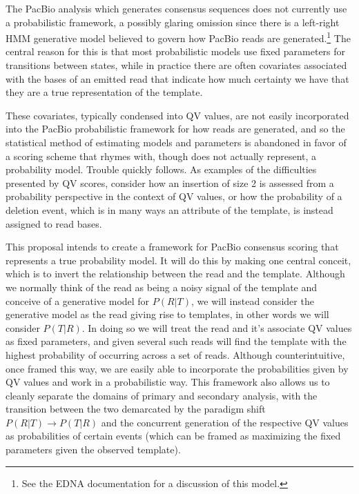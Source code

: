 \documentclass[fleqn,10pt]{SelfArx} %
\begin{document}
The PacBio analysis which generates consensus sequences does not currently use a probabilistic framework, a possibly glaring omission since there is a left-right HMM generative model believed to govern how PacBio reads are generated.\footnote{See the EDNA documentation for a discussion of this model.}  The central reason for this is that most probabilistic models use fixed parameters for transitions between states, while in practice there are often covariates associated with the bases of an emitted read that indicate how much certainty we have that they are a true representation of the template.

These covariates, typically condensed into QV values, are not easily incorporated into the PacBio probabilistic framework for how reads are generated, and so the statistical method of estimating models and parameters is abandoned in favor of a scoring scheme that rhymes with, though does not actually represent, a probability model.  Trouble quickly follows.  As examples of the difficulties presented by QV scores, consider how an insertion of size 2 is assessed from a probability perspective in the context of QV values, or how the probability of a deletion event, which is in many ways an attribute of the template, is instead assigned to read bases.

This proposal intends to create a framework for PacBio consensus scoring that represents a true probability model.  It will do this by making one central conceit, which is to invert the relationship between the read and the template.  Although we normally think of the read as being a noisy signal of the template and conceive of a generative model for $P(R|T)$, we will instead consider the generative model as the read giving rise to templates, in other words we will consider $P(T|R)$.  In doing so we will treat the read and it's associate QV values as fixed parameters, and given several such reads will find the template with the highest probability of occurring across a set of reads.  Although counterintuitive, once framed this way, we are easily able to incorporate the probabilities given by QV values and work in a probabilistic way.  This framework also allows us to cleanly separate the domains of primary and secondary analysis, with the transition between the two demarcated by the paradigm shift  $P(R|T) \rightarrow P(T|R) $ and the concurrent generation of the respective QV values as probabilities of certain events (which can be framed as maximizing the fixed parameters given the observed template). 
\end{document}
